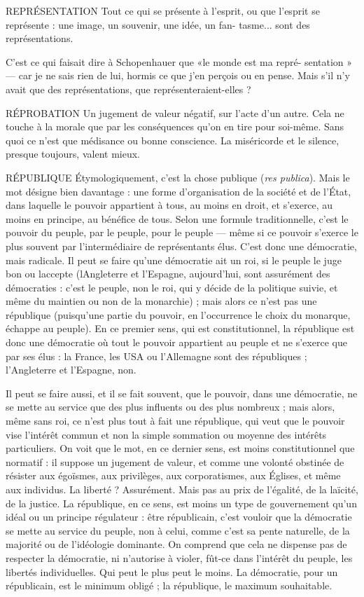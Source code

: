REPRÉSENTATION Tout ce qui se présente à l'esprit, ou que l'esprit se
représente : une image, un souvenir, une idée, un fan-
tasme... sont des représentations.

C’est ce qui faisait dire à Schopenhauer que «le monde est ma repré-
sentation » — car je ne sais rien de lui, hormis ce que j’en perçois ou en pense.
Mais s’il n’y avait que des représentations, que représenteraient-elles ?

RÉPROBATION Un jugement de valeur négatif, sur l’acte d’un autre. Cela
ne touche à la morale que par les conséquences qu’on en
tire pour soi-même. Sans quoi ce n’est que médisance ou bonne conscience. La
miséricorde et le silence, presque toujours, valent mieux.

RÉPUBLIQUE Étymologiquement, c’est la chose publique ({\it res publica}). Mais
le mot désigne bien davantage : une forme d’organisation de
la société et de l’État, dans laquelle le pouvoir appartient à tous, au moins en
droit, et s'exerce, au moins en principe, au bénéfice de tous. Selon une formule
traditionnelle, c’est le pouvoir du peuple, par le peuple, pour le peuple — même
si ce pouvoir s'exerce le plus souvent par l’intermédiaire de représentants élus.
C’est donc une démocratie, mais radicale. Il peut se faire qu’une démocratie ait
un roi, si le peuple le juge bon ou laccepte (lAngleterre et l’Espagne,
aujourd’hui, sont assurément des démocraties : c’est le peuple, non le roi, qui y
décide de la politique suivie, et même du maintien ou non de la monarchie) ;
mais alors ce n’est pas une république (puisqu’une partie du pouvoir, en
l'occurrence le choix du monarque, échappe au peuple). En ce premier sens,
qui est constitutionnel, la république est donc une démocratie où tout le pouvoir
appartient au peuple et ne s’exerce que par ses élus : la France, les USA ou
l’Allemagne sont des républiques ; l'Angleterre et l'Espagne, non.

Il peut se faire aussi, et il se fait souvent, que le pouvoir, dans une démocratie,
ne se mette au service que des plus influents ou des plus nombreux ;
mais alors, même sans roi, ce n’est plus tout à fait une république, qui veut que
le pouvoir vise l'intérêt commun et non la simple sommation ou moyenne des
intérêts particuliers. On voit que le mot, en ce dernier sens, est moins constitutionnel
que normatif : il suppose un jugement de valeur, et comme une volonté
obstinée de résister aux égoïsmes, aux privilèges, aux corporatismes, aux Églises,
et même aux individus. La liberté ? Assurément. Mais pas au prix de l'égalité,
de la laïcité, de la justice. La république, en ce sens, est moins un type de gouvernement
qu’un idéal ou un principe régulateur : être républicain, c’est vouloir
que la démocratie se mette au service du peuple, non à celui, comme c’est
sa pente naturelle, de la majorité ou de l'idéologie dominante. On comprend
que cela ne dispense pas de respecter la démocratie, ni n’autorise à violer, fût-ce
dans l’intérêt du peuple, les libertés individuelles. Qui peut le plus peut le
moins. La démocratie, pour un républicain, est le minimum obligé ; la république,
le maximum souhaitable.

